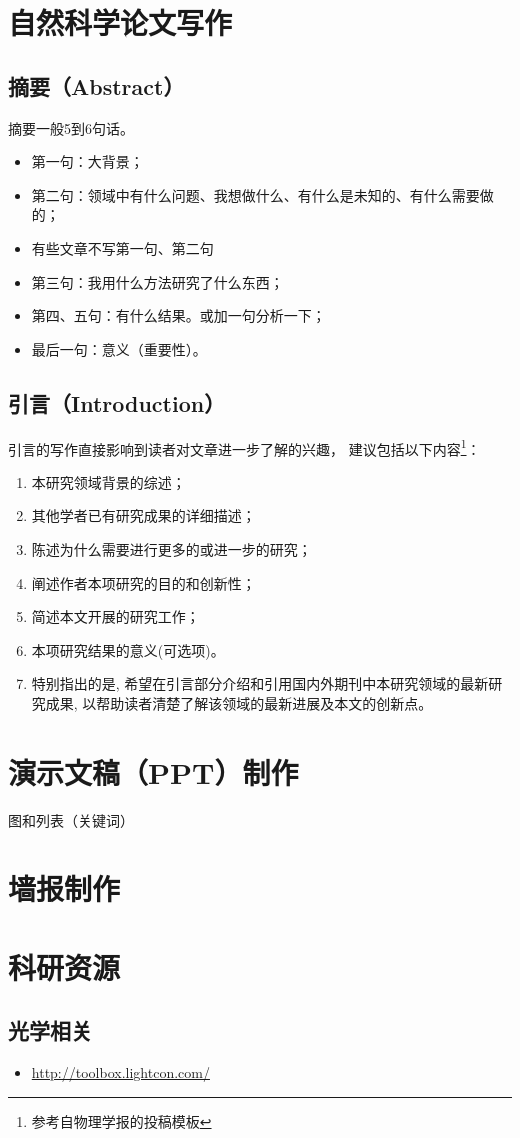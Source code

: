\section{自然科学论文写作}
\subsection{摘要（Abstract）}
摘要一般5到6句话。
\begin{itemize}
\item 第一句：大背景；
\item 第二句：领域中有什么问题、我想做什么、有什么是未知的、有什么需要做的；
\item 有些文章不写第一句、第二句
\item 第三句：我用什么方法研究了什么东西；
\item 第四、五句：有什么结果。或加一句分析一下；
\item 最后一句：意义（重要性）。
\end{itemize}


\subsection{引言（Introduction）}
引言的写作直接影响到读者对文章进一步了解的兴趣， 建议包括以下内容\footnote{参考自物理学报的投稿模板}：
\begin{enumerate}
\item 本研究领域背景的综述；
\item 其他学者已有研究成果的详细描述；
\item 陈述为什么需要进行更多的或进一步的研究；
\item 阐述作者本项研究的目的和创新性；
\item 简述本文开展的研究工作；
\item 本项研究结果的意义(可选项)。
\item 特别指出的是, 希望在引言部分介绍和引用国内外期刊中本研究领域的最新研究成果, 以帮助读者清楚了解该领域的最新进展及本文的创新点。
\end{enumerate}



\section{演示文稿（PPT）制作}
图和列表（关键词）



\section{墙报制作}




\section{科研资源}
\subsection{光学相关}
 \begin{itemize}
\item \url{http://toolbox.lightcon.com/}
\end{itemize}







